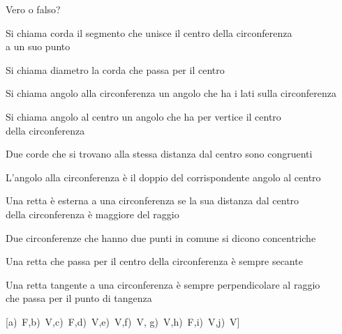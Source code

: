 \begin{esercizio}
\label{ese:5.5}
Vero o falso?
\begin{enumeratea}
\item Si chiama corda il segmento che unisce il centro della 
circonferenza \\
a un suo punto\hfill\boxV\quad\boxF
\item Si chiama diametro la corda che passa per il 
centro\hfill\boxV\quad\boxF
\item Si chiama angolo alla circonferenza un angolo che ha i lati 
sulla circonferenza\hfill\boxV\quad\boxF
\item Si chiama angolo al centro un angolo che ha per vertice il 
centro \\
della circonferenza\hfill\boxV\quad\boxF
\item Due corde che si trovano alla stessa distanza dal centro sono 
congruenti\hfill\boxV\quad\boxF
\item L'angolo alla circonferenza è il doppio del corrispondente 
angolo al centro\hfill\boxV\quad\boxF
\item Una retta è esterna a una circonferenza se la sua distanza dal 
centro \\
della circonferenza è maggiore del raggio\hfill\boxV\quad\boxF
\item Due circonferenze che hanno due punti in comune si dicono 
concentriche\hfill\boxV\quad\boxF
\item Una retta che passa per il centro della circonferenza è sempre 
secante\hfill\boxV\quad\boxF
\item Una retta tangente a una circonferenza è sempre perpendicolare 
al raggio \\
che passa per il punto di tangenza\hfill\boxV\quad\boxF
\end{enumeratea}
\hfill [a)~F,\quad b)~V,\quad c)~F,\quad d)~V,\quad e)~V,\quad f)~V,\quad 
g)~V,\quad h)~F,\quad i)~V,\quad j)~V]
\end{esercizio}

